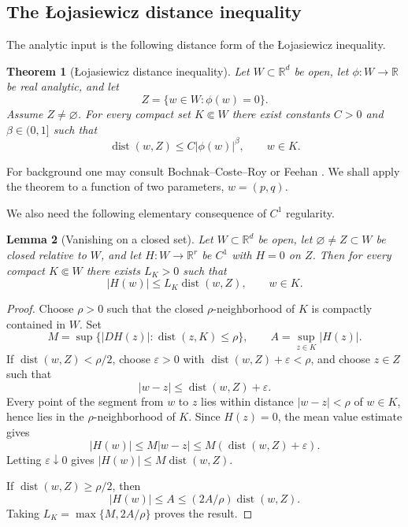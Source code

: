 \documentclass[12pt,oneside]{amsart}
\newtheorem{theorem}{Theorem}[section]
\newtheorem{lemma}[theorem]{Lemma}
\newcommand{\R}{\mathbb R}
\newcommand{\dist}{\operatorname{dist}}
\begin{document}
\subsection{The \L{}ojasiewicz distance inequality}

The analytic input is the following distance form of the \L{}ojasiewicz inequality.

\begin{theorem}[\L{}ojasiewicz distance inequality]\label{thm:lojasiewicz}
Let $W\subset\R^d$ be open, let $\phi:W\to\R$ be real analytic, and let
\[
        Z=\{w\in W:\phi(w)=0\}.
\]
Assume $Z\ne\varnothing$.  For every compact set $K\Subset W$ there exist constants $C>0$ and $\beta\in(0,1]$ such that
\[
        \dist(w,Z)\le C|\phi(w)|^\beta,
        \qquad w\in K .
\]
\end{theorem}

For background one may consult Bochnak--Coste--Roy \cite[Sec. 2.6]{BochnakCosteRoy1998} or Feehan \cite{Feehan2020}.  We shall apply the theorem to a function of two parameters, $w=(p,q)$.

We also need the following elementary consequence of $C^1$ regularity.

\begin{lemma}[Vanishing on a closed set]\label{lem:vanishing-distance}
Let $W\subset\R^d$ be open, let $\varnothing\ne Z\subset W$ be closed relative to $W$, and let $H:W\to\R^r$ be $C^1$ with $H=0$ on $Z$.  Then for every compact $K\Subset W$ there exists $L_K>0$ such that
\[
        |H(w)|\le L_K\dist(w,Z),
        \qquad w\in K .
\]
\end{lemma}

\begin{proof}
Choose $\rho>0$ such that the closed $\rho$-neighborhood of $K$ is compactly contained in $W$.  Set
\[
        M=\sup\{|DH(z)|:\dist(z,K)\le \rho\},
        \qquad
        A=\sup_{z\in K}|H(z)| .
\]
If $\dist(w,Z)<\rho/2$, choose $\varepsilon>0$ with $\dist(w,Z)+\varepsilon<\rho$, and choose $z\in Z$ such that
\[
        |w-z|\le \dist(w,Z)+\varepsilon .
\]
Every point of the segment from $w$ to $z$ lies within distance $|w-z|<\rho$ of $w\in K$, hence lies in the $\rho$-neighborhood of $K$.  Since $H(z)=0$, the mean value estimate gives
\[
        |H(w)|\le M|w-z|
        \le M(\dist(w,Z)+\varepsilon).
\]
Letting $\varepsilon\downarrow0$ gives $|H(w)|\le M\dist(w,Z)$.

If $\dist(w,Z)\ge\rho/2$, then
\[
        |H(w)|\le A\le (2A/\rho)\dist(w,Z).
\]
Taking $L_K=\max\{M,2A/\rho\}$ proves the result.
\end{proof}
\end{document}
